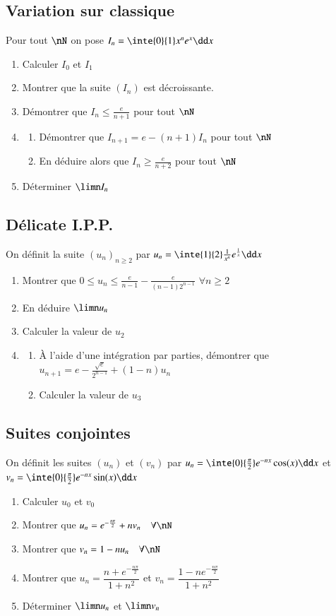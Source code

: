 \documentclass[oneside,12pt]{article}          %
\begin{document}
\subsection{Variation sur classique}
Pour tout $\nN$ on pose $I_n=\inte{0}{1}x^ne^x\dd x$
\begin{enumerate}
    \item Calculer $I_0$ et $I_1$
    \item Montrer que la suite $(I_n)$ est décroissante.
    \item Démontrer que $I_n \leq \frac{e}{n+1}$ \quad pour tout $\nN$
    \item \begin{enumerate}
    	\item Démontrer que $I_{n+1}=e-(n+1)I_n$ \quad pour tout $\nN$
    	\item En déduire alors que $I_n\geq \frac{e}{n+2}$ \quad pour tout $\nN$
	\end{enumerate}
    \item Déterminer $\limn I_n$
\end{enumerate}



\subsection{Délicate I.P.P.}
On définit la suite $(u_n)_{n\geq2}$ par $u_n=\inte{1}{2}\frac{1}{x^n}e^{\frac{1}{x}}\dd x$
\begin{enumerate}
	\item Montrer que $0\leq u_n \leq \frac{e}{n-1}-\frac{e}{(n-1)2^{n-1}}$ \quad $\forall n\geq2$
	\item En déduire $\limn u_n$
	\item Calculer la valeur de $u_2$
	\item \begin{enumerate}
		\item À l'aide d'une intégration par parties, démontrer que $u_{n+1}=e-\frac{\sqrt{e}}{2^{n-1}}+(1-n)u_n$
		\item Calculer la valeur de $u_3$
	\end{enumerate}
\end{enumerate}



\subsection{Suites conjointes}
On définit les suites $(u_n)$ et $(v_n)$ par $u_n=\inte{0}{\frac{\pi}{2}}e^{-nx}\cos(x)\dd x$ et $v_n=\inte{0}{\frac{\pi}{2}}e^{-nx}\sin(x)\dd x$
\begin{enumerate}
    \item Calculer $u_0$ et $v_0$
    \item Montrer que $u_n=e^{-\frac{n\pi}{2}}+nv_n \quad \forall\nN$
    \item Montrer que $v_n=1-nu_n \quad \forall\nN$
    \item Montrer que $u_n=\dfrac{n+e^{-\frac{n\pi}{2}}}{1+n^2}$ et $v_n=\dfrac{1-ne^{-\frac{n\pi}{2}}}{1+n^2}$
    \item Déterminer $\limn u_n$ et $\limn v_n$
\end{enumerate}
\end{document}
